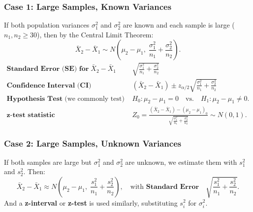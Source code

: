 \documentclass[10pt, total={6in, 8in}]{extarticle}
\begin{document}
\subsubsection{Case 1: Large Samples, Known Variances}
If both population variances $\sigma_1^2$ and $\sigma_2^2$ are known and each sample is large ($n_1, n_2 \ge 30$), then by the Central Limit Theorem:
$$
    \bar{X}_2 - \bar{X}_1 \sim N\!\left(\mu_2 - \mu_1, \; \frac{\sigma_1^2}{n_1} + \frac{\sigma_2^2}{n_2}\right).
$$
\begin{align*}
    \textbf{Standard Error (SE) for} \; \bar{X}_2 - \bar{X}_1 \quad\quad & \sqrt{\frac{\sigma_1^2}{n_1} + \frac{\sigma_2^2}{n_2}}                                                                        \\
    \textbf{Confidence Interval (CI)} \quad\quad                         & (\bar{X}_2 - \bar{X}_1) \pm z_{\alpha/2} \sqrt{\frac{\sigma_1^2}{n_1} + \frac{\sigma_2^2}{n_2}}                               \\
    \textbf{Hypothesis Test} \; \text{(we commonly test)} \quad\quad     & H_0 : \mu_2 - \mu_1 = 0 \quad \text{vs.} \quad H_1 : \mu_2 - \mu_1 \neq 0.                                                    \\
    \textbf{z-test statistic} \quad\quad                                 & Z_0 = \frac{(\bar{X}_2 - \bar{X}_1) - (\mu_2 - \mu_1)_0}{\sqrt{\frac{\sigma_1^2}{n_1} + \frac{\sigma_2^2}{n_2}}} \sim N(0,1).
\end{align*}

\subsubsection{Case 2: Large Samples, Unknown Variances}
If both samples are large but $\sigma_1^2$ and $\sigma_2^2$ are unknown, we estimate them with $s_1^2$ and $s_2^2$. Then:
$$
    \bar{X}_2 - \bar{X}_1 \approx N\!\left(\mu_2 - \mu_1, \; \frac{s_1^2}{n_1} + \frac{s_2^2}{n_2}\right), \quad \text{with }\textbf{Standard Error} \quad \sqrt{\frac{s_1^2}{n_1} + \frac{s_2^2}{n_2}}.
$$
And a \textbf{z-interval} or \textbf{z-test} is used similarly, substituting $s_i^2$ for $\sigma_i^2$.
\end{document}
